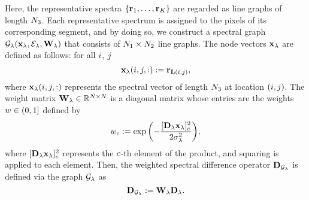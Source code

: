 Here, the representative spectra $\{ \mathbf{r}_{1}, \ldots, \mathbf{r}_{K} \}$ are regarded as line graphs of length $N_{3}$.
Each representative spectrum is assigned to the pixels of its corresponding segment, and by doing so, we construct a spectral graph $\mathcal{G}_{\lambda}(\mathbf{x}_{\lambda}, \mathcal{E}_{\lambda}, \mathbf{W}_{\lambda})$ that consists of $N_{1} \times N_{2}$ line graphs.
The node vectors $\mathbf{x}_{\lambda}$ are defined as follows: for all $i$, $j$
\begin{equation}
    \label{eq:SpectralGraphNode}
    \mathbf{x}_{\lambda}(i, j, :) := \mathbf{r}_{\mathbf{L}(i, j)},
\end{equation}
where $\mathbf{x}_{\lambda}(i, j, :)$ represents the spectral vector of length $N_{3}$ at location $(i, j)$.
The weight matrix $\mathbf{W}_{\lambda} \in \mathbb{R}^{N \times N}$ is a diagonal matrix whose entries are the weights $w_{} \in (0, 1]$ defined by
\begin{equation}
    \label{eq:SpectralGraphWeight}
    w_{c} := \exp{\left( - \frac{[\mathbf{D}_{\lambda}\mathbf{x}_{\lambda}]_{c}^{2}}{2\sigma_{\lambda}^{2}}\right)},
\end{equation} %
where $[\mathbf{D}_{\lambda} \mathbf{x}_{\lambda}]_{c}^{2}$ represents the $c$-th element of the product, and squaring is applied to each element.
Then, the weighted spectral difference operator $\mathbf{D}_{\mathcal{G}_{\lambda}}$ is defined via the graph $\mathcal{G}_{\lambda}$ as 
\begin{equation}
    \label{eq:SpectralGraphTV}
    \mathbf{D}_{\mathcal{G}_{\lambda}} := \mathbf{W}_{\lambda} \mathbf{D}_{\lambda}.
\end{equation}


